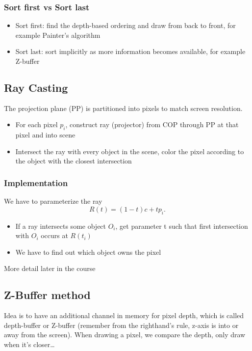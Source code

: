 \documentclass[11pt]{article}
\begin{document}
\subsubsection*{Sort first vs Sort last}
\begin{itemize}
    \item Sort first: find the depth-based ordering and draw from back to front, for example Painter's algorithm
    \item Sort last: sort implicitly as more information becomes available, for example Z-buffer
\end{itemize}

\subsection{Ray Casting}
The projection plane (PP) is partitioned into pixels to match screen resolution. \begin{itemize}
    \item For each pixel $p_i$, construct ray (projector) from COP through PP at that pixel and into scene
    \item Intersect the ray with every object in the scene, color the pixel according to the object with the closest intersection 
\end{itemize}

\subsubsection*{Implementation}
We have to parameterize the ray \[
R(t) = (1-t)c + tp_i
.\] 
\begin{itemize}
    \item If a ray intersects some object $O_i$, get parameter t such that first intersection with $O_i$ occurs at $R(t_i)$
    \item We have to find out which object owns the pixel 
\end{itemize}

More detail later in the course


\subsection{Z-Buffer method}
Idea is to have an additional channel in memory for pixel depth, which is called depth-buffer or Z-buffer (remember from the righthand's rule, z-axis is into or away from the screen). When drawing a pixel, we compare the depth, only draw when it's closer\dots
\end{document}
